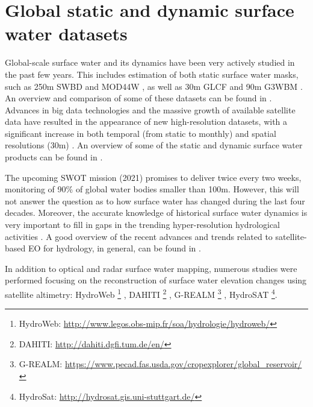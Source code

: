
\section{Global static and dynamic surface water datasets}

Global-scale surface water and its dynamics have been very actively studied in the past few years. This includes estimation of both static surface water masks, such as 250m SWBD \citep{farr2007shuttle} and MOD44W \citep{carroll2009new}, as well as 30m GLCF \citep{feng2016global} and 90m G3WBM \citep{yamazaki2015development}.
An overview and comparison of some of these datasets can be found in \citep{lamarche2017compilation}. Advances in big data technologies and the massive growth of available satellite data have resulted in the appearance of new high-resolution datasets, with a significant increase in both temporal (from static to monthly) and spatial resolutions (30m) \citep{pekel2016high}. An overview of some of the static and dynamic surface water products can be found in \citep{yamazaki2016hydrology}.

The upcoming SWOT mission (2021) promises to deliver twice every two weeks, monitoring of 90\% of global water bodies smaller than 100m. However, this will not answer the question as to how surface water has changed during the last four decades. Moreover, the accurate knowledge of historical surface water dynamics is very important to fill in gaps in the trending hyper-resolution hydrological activities \citep{bierkens2015hyper}. A good overview of the recent advances and trends related to satellite-based EO for hydrology, in general, can be found in \citep{mccabe2017future}.

In addition to optical and radar surface water mapping, numerous studies were performed focusing on the reconstruction of surface water elevation changes using satellite altimetry: HydroWeb \footnote{HydroWeb: \url{http://www.legos.obs-mip.fr/soa/hydrologie/hydroweb/}} \citep{cretaux2005satellite}, DAHITI \footnote{DAHITI: \url{http://dahiti.dgfi.tum.de/en/}} \citep{schwatke2015dahiti}, G-REALM \footnote{G-REALM: \url{https://www.pecad.fas.usda.gov/cropexplorer/global_reservoir/}} \citep{birkett2011research}, HydroSAT \footnote{HydroSat: \url{http://hydrosat.gis.uni-stuttgart.de/}}. 

